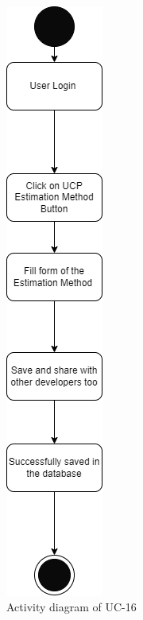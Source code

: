 \begin{figure}[H]
    \centering
    \includegraphics[scale=0.7]{./diagrams/Activity Diagram/ad-16.png}
    \caption{Activity diagram of UC-16}
    \label{fig:act-16}

\end{figure}


